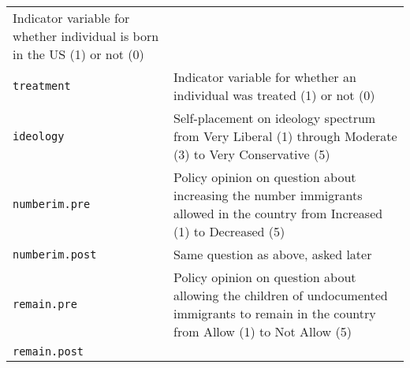 \documentclass[]{article}
\begin{document}
\begin{longtable}[]{@{}ll@{}}
\begin{minipage}[t]{0.68\columnwidth}
Indicator variable for whether individual is born in the US (1) or not
(0)\strut
\end{minipage}\tabularnewline
\begin{minipage}[t]{0.25\columnwidth}\raggedright\strut
\texttt{treatment}\strut
\end{minipage} & \begin{minipage}[t]{0.68\columnwidth}\raggedright\strut
Indicator variable for whether an individual was treated (1) or not
(0)\strut
\end{minipage}\tabularnewline
\begin{minipage}[t]{0.25\columnwidth}\raggedright\strut
\texttt{ideology}\strut
\end{minipage} & \begin{minipage}[t]{0.68\columnwidth}\raggedright\strut
Self-placement on ideology spectrum from Very Liberal (1) through
Moderate (3) to Very Conservative (5)\strut
\end{minipage}\tabularnewline
\begin{minipage}[t]{0.25\columnwidth}\raggedright\strut
\texttt{numberim.pre}\strut
\end{minipage} & \begin{minipage}[t]{0.68\columnwidth}\raggedright\strut
Policy opinion on question about increasing the number immigrants
allowed in the country from Increased (1) to Decreased (5)\strut
\end{minipage}\tabularnewline
\begin{minipage}[t]{0.25\columnwidth}\raggedright\strut
\texttt{numberim.post}\strut
\end{minipage} & \begin{minipage}[t]{0.68\columnwidth}\raggedright\strut
Same question as above, asked later\strut
\end{minipage}\tabularnewline
\begin{minipage}[t]{0.25\columnwidth}\raggedright\strut
\texttt{remain.pre}\strut
\end{minipage} & \begin{minipage}[t]{0.68\columnwidth}\raggedright\strut
Policy opinion on question about allowing the children of undocumented
immigrants to remain in the country from Allow (1) to Not Allow
(5)\strut
\end{minipage}\tabularnewline
\begin{minipage}[t]{0.25\columnwidth}\raggedright\strut
\texttt{remain.post}\strut
\end{minipage} & \begin{minipage}[t]{0.68\columnwidth}\raggedright\strut

\end{minipage}
\end{longtable}
\end{document}
